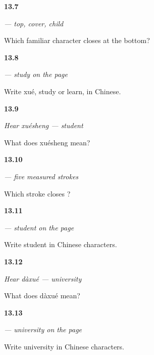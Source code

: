 \noindent\begin{minipage}[t]{\linewidth}
\raggedright
\hypertarget{review-ZH-W13-xue-build}{\textbf{13.7}} \emph{ — top, cover, child}\par
\small Which familiar character closes  at the bottom?
\end{minipage}\par\medskip

\noindent\begin{minipage}[t]{\linewidth}
\raggedright
\hypertarget{review-ZH-C13-xue-write}{\textbf{13.8}} \emph{ — study on the page}\par
\small Write xué, study or learn, in Chinese.
\end{minipage}\par\medskip

\noindent\begin{minipage}[t]{\linewidth}
\raggedright
\hypertarget{review-ZH-C13-hear-xuesheng-meaning}{\textbf{13.9}} \emph{Hear \emph{xuésheng} — student}\par
\small What does xuésheng mean?
\end{minipage}\par\medskip

\noindent\begin{minipage}[t]{\linewidth}
\raggedright
\hypertarget{review-ZH-W13-sheng-order}{\textbf{13.10}} \emph{ — five measured strokes}\par
\small Which stroke closes ?
\end{minipage}\par\medskip

\noindent\begin{minipage}[t]{\linewidth}
\raggedright
\hypertarget{review-ZH-C13-xuesheng-write}{\textbf{13.11}} \emph{ — student on the page}\par
\small Write student in Chinese characters.
\end{minipage}\par\medskip

\noindent\begin{minipage}[t]{\linewidth}
\raggedright
\hypertarget{review-ZH-C13-hear-daxue-meaning}{\textbf{13.12}} \emph{Hear \emph{dàxué} — university}\par
\small What does dàxué mean?
\end{minipage}\par\medskip

\noindent\begin{minipage}[t]{\linewidth}
\raggedright
\hypertarget{review-ZH-C13-daxue-write}{\textbf{13.13}} \emph{ — university on the page}\par
\small Write university in Chinese characters.
\end{minipage}\par\medskip


